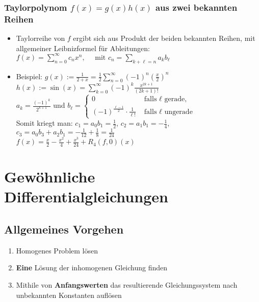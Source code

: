 \documentclass[a3paper, 11pt, landscape]{scrartcl}
\begin{document}
\begin{multicols*}{3}
	\subsubsection{Taylorpolynom $f(x)=g(x)h(x)$ aus zwei bekannten Reihen}
	\begin{itemize}
	    \item Taylorreihe von $f$ ergibt sich aus Produkt der beiden bekannten Reihen, mit allgemeiner Leibnizformel für Ableitungen:\\
	    $f(x)=\sum_{n=0}^{\infty} c_{n} x^{n}, \quad \text { mit } c_{n}=\sum_{k+\ell=n} a_{k} b_{\ell}$
	    \item Beispiel: $g(x):=\frac{1}{2+x}=\frac{1}{2} \sum_{n=0}^{\infty}(-1)^{n}\left(\frac{x}{2}\right)^{n}$ \\
	    $h(x):=\sin (x)=\sum_{k=0}^{\infty}(-1)^{k} \frac{x^{2 k+1}}{(2 k+1) !}$\\
	    $a_k=\frac{(-1)^k}{2^{k+1}}$ und $b_{\ell}=\left\{\begin{aligned}
0 & \text { falls } \ell \text { gerade, } \\
(-1)^{\frac{\ell-1}{2}} \cdot \frac{1}{\ell !} & \text { falls } \ell \text { ungerade }
\end{aligned}\right.$\\
        Somit kriegt man: $c_1 = a_0 b_1=\frac{1}{2}$, $c_2=a_1 b_1 = -\frac{1}{4}$, $c_3=a_0 b_3 + a_2 b_1 = -\frac{1}{12}+\frac{1}{8}=\frac{1}{24}$\\
        $f(x)=\frac{x}{2}-\frac{x^2}{4}+\frac{x^3}{24}+R_4(f,0)(x)$
	\end{itemize}
	
	\section{Gewöhnliche Differentialgleichungen}
	\subsection{Allgemeines Vorgehen}
	\begin{enumerate}
	    \item Homogenes Problem lösen
	    \item \textbf{Eine} Lösung der inhomogenen Gleichung finden
	    \item Mithile von \textbf{Anfangswerten} das resultierende Gleichungssystem nach unbekannten Konstanten auflösen
	\end{enumerate}

\end{multicols*}
\end{document}
